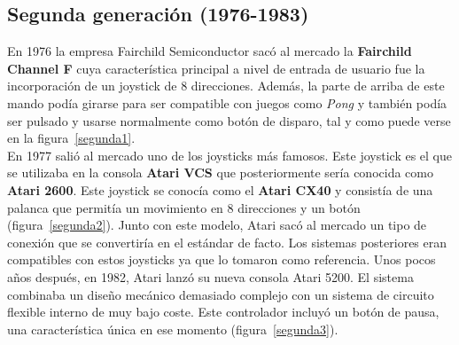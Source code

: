 \subsection{Segunda generaci\'on (1976-1983)}


En 1976 la empresa Fairchild Semiconductor sac\'o al mercado la \textbf{Fairchild Channel F} cuya caracter\'istica principal a nivel de entrada de usuario fue la incorporaci\'on de un joystick de 8 direcciones.  Adem\'as, la parte de arriba de este mando pod\'ia girarse para ser compatible con juegos como \textit{Pong} y tambi\'en pod\'ia ser pulsado y usarse normalmente como bot\'on de disparo, tal y como puede verse en la figura~\ref{segunda1}.\\

En 1977 sali\'o al mercado uno de los joysticks m\'as famosos. Este joystick es el que se utilizaba en la consola \textbf{Atari VCS} que posteriormente ser\'ia conocida como \textbf{Atari 2600}. Este joystick se conoc\'ia como el \textbf{Atari CX40} y consist\'ia de una palanca que permit\'ia un movimiento en 8 direcciones y un bot\'on (figura~\ref{segunda2}). Junto con este modelo, Atari sac\'o al mercado un tipo de conexi\'on que se convertir\'ia en el est\'andar de facto. Los sistemas posteriores eran compatibles con estos joysticks ya que lo tomaron como referencia. Unos pocos a\~nos despu\'es, en 1982, Atari lanz\'o su nueva consola Atari 5200. El sistema combinaba un dise\~no mec\'anico demasiado complejo con un sistema de circuito flexible interno de muy bajo coste. Este controlador incluy\'o un bot\'on de pausa, una caracter\'istica \'unica en ese momento (figura~\ref{segunda3}).\\


